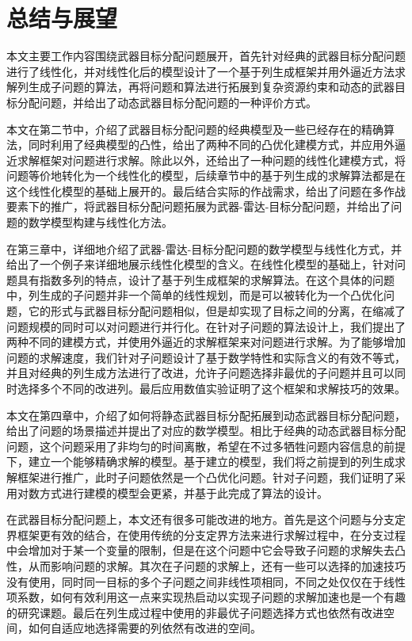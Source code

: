 
\chapter{总结与展望}
本文主要工作内容围绕武器目标分配问题展开，首先针对经典的武器目标分配问题进行了线性化，并对线性化后的模型设计了一个基于列生成框架并用外逼近方法求解列生成子问题的算法，再将问题和算法进行拓展到复杂资源约束和动态的武器目标分配问题，并给出了动态武器目标分配问题的一种评价方式。

本文在第二节中，介绍了武器目标分配问题的经典模型及一些已经存在的精确算法，同时利用了经典模型的凸性，给出了两种不同的凸优化建模方式，并应用外逼近求解框架对问题进行求解。除此以外，还给出了一种问题的线性化建模方式，将问题等价地转化为一个线性化的模型，后续章节中的基于列生成的求解算法都是在这个线性化模型的基础上展开的。最后结合实际的作战需求，给出了问题在多作战要素下的推广，将武器目标分配问题拓展为武器-雷达-目标分配问题，并给出了问题的数学模型构建与线性化方法。

在第三章中，详细地介绍了武器-雷达-目标分配问题的数学模型与线性化方式，并给出了一个例子来详细地展示线性化模型的含义。在线性化模型的基础上，针对问题具有指数多列的特点，设计了基于列生成框架的求解算法。在这个具体的问题中，列生成的子问题并非一个简单的线性规划，而是可以被转化为一个凸优化问题，它的形式与武器目标分配问题相似，但是却实现了目标之间的分离，在缩减了问题规模的同时可以对问题进行并行化。在针对子问题的算法设计上，我们提出了两种不同的建模方式，并使用外逼近的求解框架来对问题进行求解。为了能够增加问题的求解速度，我们针对子问题设计了基于数学特性和实际含义的有效不等式，并且对经典的列生成方法进行了改进，允许子问题选择非最优的子问题并且可以同时选择多个不同的改进列。最后应用数值实验证明了这个框架和求解技巧的效果。

本文在第四章中，介绍了如何将静态武器目标分配拓展到动态武器目标分配问题，给出了问题的场景描述并提出了对应的数学模型。相比于经典的动态武器目标分配问题，这个问题采用了非均匀的时间离散，希望在不过多牺牲问题内容信息的前提下，建立一个能够精确求解的模型。基于建立的模型，我们将之前提到的列生成求解框架进行推广，此时子问题依然是一个凸优化问题。针对子问题，我们证明了采用对数方式进行建模的模型会更紧，并基于此完成了算法的设计。

在武器目标分配问题上，本文还有很多可能改进的地方。首先是这个问题与分支定界框架更有效的结合，在使用传统的分支定界方法来进行求解过程中，在分支过程中会增加对于某一个变量的限制，但是在这个问题中它会导致子问题的求解失去凸性，从而影响问题的求解。其次在子问题的求解上，还有一些可以选择的加速技巧没有使用，同时同一目标的多个子问题之间非线性项相同，不同之处仅仅在于线性项系数，如何有效利用这一点来实现热启动以实现子问题的求解加速也是一个有趣的研究课题。最后在列生成过程中使用的非最优子问题选择方式也依然有改进空间，如何自适应地选择需要的列依然有改进的空间。